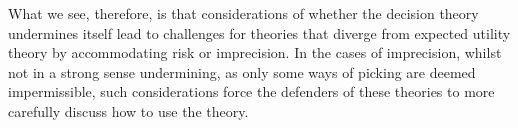 \documentclass[a4paper,final]{article}
\newcommand\A{\mathcal{A}}
\newcommand\Exp{\mathsf{Exp}}
\newcommand\EU{\mathrm{EU}}
\newcommand\ut{u}
\newcommand\s{\mathsf{s}}
\newcommand\SetDelimiter[1][]{
	\nonscript\,#1\vert \allowbreak \nonscript\,\mathopen{}}
\providecommand\given{\SetDelimiter}
\renewcommand{\leq}{\leqslant}
\newenvironment{CCM rewritten}
{\begingroup\color{blue}} %
{\endgroup}              %
\begin{document}
	What we see, therefore, is that considerations of whether the decision theory undermines itself lead to challenges for theories that diverge from expected utility theory by accommodating risk or imprecision. In the cases of imprecision, whilst not in a strong sense undermining, as only some ways of picking are deemed impermissible, such considerations force the defenders of these theories to more carefully discuss how to use the theory. 
	





\end{document}
